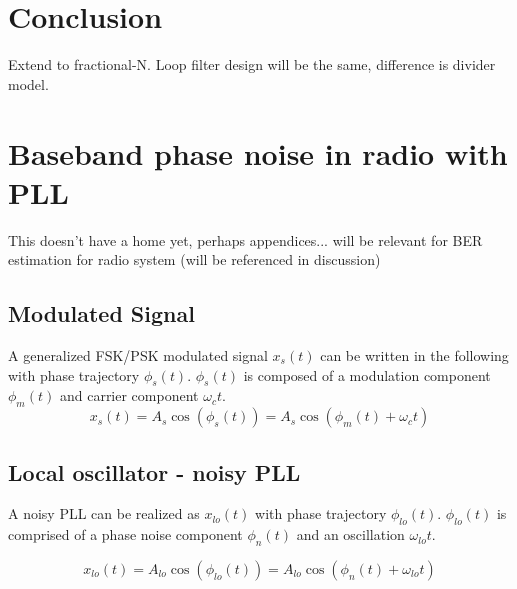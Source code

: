     \section{Conclusion} \label{conclusion}
    Extend to fractional-N. Loop filter design will be the same, difference is divider model.



	\section{Baseband phase noise in radio with PLL}
		This doesn't have a home yet, perhaps appendices... will be relevant for BER estimation for radio system (will be referenced in discussion)

	\subsection{Modulated Signal}
		A generalized FSK/PSK modulated signal $x_s(t)$ can be written in the following with phase trajectory $\phi_s(t)$. $\phi_s(t)$ is composed of a modulation component $\phi_m(t)$ and carrier component $\omega_ct$.
		\begin{equation}
			x_s(t) = A_s\cos(\phi_s(t)) = A_s\cos(\phi_m(t)+\omega_ct)
		\end{equation} 

	\subsection{Local oscillator - noisy PLL}
		A noisy PLL can be realized as $x_{lo}(t)$ with phase trajectory $\phi_{lo}(t)$. $\phi_{lo}(t)$ is comprised of a phase noise component $\phi_{n}(t)$ and an oscillation $\omega_{lo}t$. 

		\begin{equation}
			x_{lo}(t)  = A_{lo}\cos(\phi_{lo}(t)) = A_{lo}\cos(\phi_n(t)+\omega_{lo}t)
		\end{equation} 

